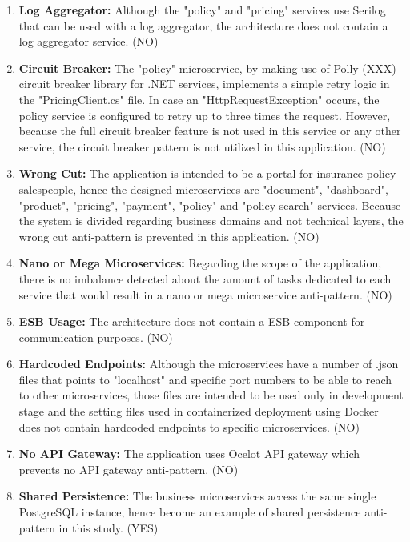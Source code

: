 \documentclass{Configuration_Files/PoliMi3i_thesis}
\begin{document}
\begin{enumerate}
    \item \textbf{Log Aggregator:} Although the "policy" and "pricing" services use Serilog that can be used with a log aggregator, the architecture does not contain a log aggregator service. (NO)
    
    \item \textbf{Circuit Breaker:} The "policy" microservice, by making use of Polly (XXX) circuit breaker library for .NET services, implements a simple retry logic in the "PricingClient.cs" file.
    In case an "HttpRequestException" occurs, the policy service is configured to retry up to three times the request.
    However, because the full circuit breaker feature is not used in this service or any other service, the circuit breaker pattern is not utilized in this application. (NO)
    
    \item \textbf{Wrong Cut:} The application is intended to be a portal for insurance policy salespeople, hence the designed microservices are "document", "dashboard", "product", "pricing", "payment", "policy" and "policy search" services.
    Because the system is divided regarding business domains and not technical layers, the wrong cut anti-pattern is prevented in this application. (NO)
    
    \item \textbf{Nano or Mega Microservices:} Regarding the scope of the application, there is no imbalance detected about the amount of tasks dedicated to each service that would result in a nano or mega microservice anti-pattern. (NO)
    
    \item \textbf{ESB Usage:} The architecture does not contain a ESB component for communication purposes. (NO)
    
    \item \textbf{Hardcoded Endpoints:} Although the microservices have a number of .json files that points to "localhost" and specific port numbers to be able to reach to other microservices, those files are intended to be used only in development stage and the setting files used in containerized deployment using Docker does not contain hardcoded endpoints to specific microservices. (NO)
    
    \item \textbf{No API Gateway:} The application uses Ocelot API gateway which prevents no API gateway anti-pattern. (NO)
    
    \item \textbf{Shared Persistence:} The business microservices access the same single PostgreSQL instance, hence become an example of shared persistence anti-pattern in this study. (YES)
    

\end{enumerate}
\end{document}

